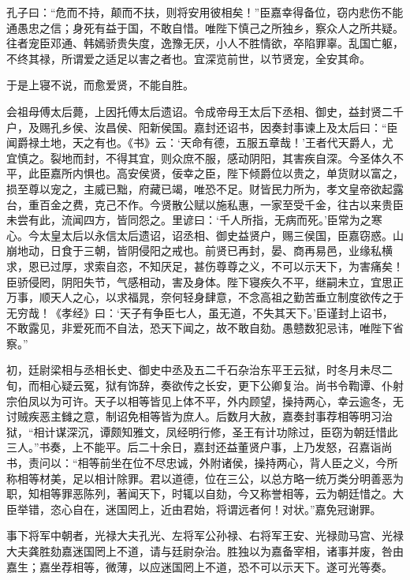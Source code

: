 \documentclass[12pt,UTF8]{ctexbook}
\begin{document}
孔子曰：“危而不持，颠而不扶，则将安用彼相矣！”臣嘉幸得备位，窃内悲伤不能通愚忠之信；身死有益于国，不敢自惜。唯陛下慎己之所独乡，察众人之所共疑。往者宠臣邓通、韩嫣骄贵失度，逸豫无厌，小人不胜情欲，卒陷罪辜。乱国亡躯，不终其禄，所谓爱之适足以害之者也。宜深览前世，以节贤宠，全安其命。



于是上寝不说，而愈爱贤，不能自胜。



会祖母傅太后薨，上因托傅太后遗诏。令成帝母王太后下丞相、御史，益封贤二千户，及赐孔乡侯、汝昌侯、阳新侯国。嘉封还诏书，因奏封事谏上及太后曰：“臣闻爵禄土地，天之有也。《书》云：‘天命有德，五服五章哉！’王者代天爵人，尤宜慎之。裂地而封，不得其宜，则众庶不服，感动阴阳，其害疾自深。今圣体久不平，此臣嘉所内惧也。高安侯贤，佞幸之臣，陛下倾爵位以贵之，单货财以富之，损至尊以宠之，主威已黜，府藏已竭，唯恐不足。财皆民力所为，孝文皇帝欲起露台，重百金之费，克己不作。今贤散公赋以施私惠，一家至受千金，往古以来贵臣未尝有此，流闻四方，皆同怨之。里谚曰：‘千人所指，无病而死。’臣常为之寒心。今太皇太后以永信太后遗诏，诏丞相、御史益贤户，赐三侯国，臣嘉窃惑。山崩地动，日食于三朝，皆阴侵阳之戒也。前贤已再封，晏、商再易邑，业缘私横求，恩已过厚，求索自恣，不知厌足，甚伤尊尊之义，不可以示天下，为害痛矣！臣骄侵罔，阴阳失节，气感相动，害及身体。陛下寝疾久不平，继嗣未立，宜思正万事，顺天人之心，以求福晁，奈何轻身肆意，不念高祖之勤苦垂立制度欲传之于无穷哉！《孝经》曰：‘天子有争臣七人，虽无道，不失其天下。’臣谨封上诏书，不敢露见，非爱死而不自法，恐天下闻之，故不敢自劾。愚戆数犯忌讳，唯陛下省察。”



初，廷尉梁相与丞相长史、御史中丞及五二千石杂治东平王云狱，时冬月未尽二旬，而相心疑云冤，狱有饰辞，奏欲传之长安，更下公卿复治。尚书令鞫谭、仆射宗伯凤以为可许。天子以相等皆见上体不平，外内顾望，操持两心，幸云逾冬，无讨贼疾恶主雠之意，制诏免相等皆为庶人。后数月大赦，嘉奏封事荐相等明习治狱，“相计谋深沉，谭颇知雅文，凤经明行修，圣王有计功除过，臣窃为朝廷惜此三人。”书奏，上不能平。后二十余日，嘉封还益董贤户事，上乃发怒，召嘉诣尚书，责问以：“相等前坐在位不尽忠诚，外附诸侯，操持两心，背人臣之义，今所称相等材美，足以相计除罪。君以道德，位在三公，以总方略一统万类分明善恶为职，知相等罪恶陈列，著闻天下，时辄以自劾，今又称誉相等，云为朝廷惜之。大臣举错，恣心自在，迷国罔上，近由君始，将谓远者何！对状。”嘉免冠谢罪。



事下将军中朝者，光禄大夫孔光、左将军公孙禄、右将军王安、光禄勋马宫、光禄大夫龚胜劾嘉迷国罔上不道，请与廷尉杂治。胜独以为嘉备宰相，诸事并废，咎由嘉生；嘉坐荐相等，微薄，以应迷国罔上不道，恐不可以示天下。遂可光等奏。
\end{document}

